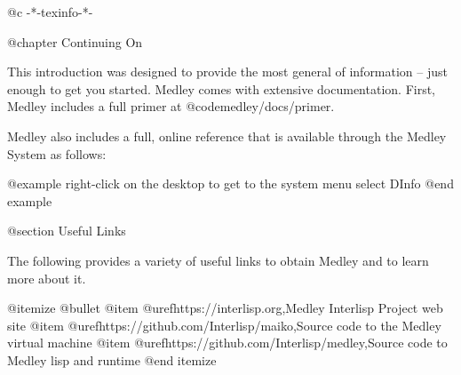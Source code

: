 @c -*-texinfo-*-

@chapter Continuing On

This introduction was designed to provide the most general of
information -- just enough to get you started.  Medley comes
with extensive documentation.  First, Medley includes a
full primer at @code{medley/docs/primer}.

Medley also includes a full, online reference that is available
through the Medley System as follows:

@example
right-click on the desktop to get to the system menu
select DInfo
@end example

@section Useful Links

The following provides a variety of useful links to obtain Medley and
to learn more about it.

@itemize @bullet
@item
@uref{https://interlisp.org,Medley Interlisp Project web site}
@item
@uref{https://github.com/Interlisp/maiko,Source code to the Medley virtual machine}
@item
@uref{https://github.com/Interlisp/medley,Source code to Medley lisp and runtime}
@end itemize
